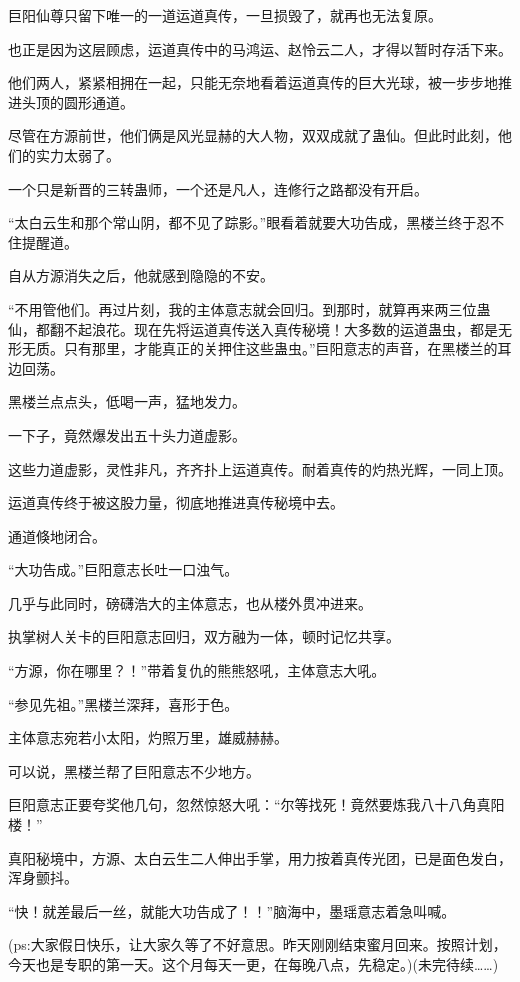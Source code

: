 \begin{this_body}
巨阳仙尊只留下唯一的一道运道真传，一旦损毁了，就再也无法复原。

也正是因为这层顾虑，运道真传中的马鸿运、赵怜云二人，才得以暂时存活下来。

他们两人，紧紧相拥在一起，只能无奈地看着运道真传的巨大光球，被一步步地推进头顶的圆形通道。

尽管在方源前世，他们俩是风光显赫的大人物，双双成就了蛊仙。但此时此刻，他们的实力太弱了。

一个只是新晋的三转蛊师，一个还是凡人，连修行之路都没有开启。

“太白云生和那个常山阴，都不见了踪影。”眼看着就要大功告成，黑楼兰终于忍不住提醒道。

自从方源消失之后，他就感到隐隐的不安。

“不用管他们。再过片刻，我的主体意志就会回归。到那时，就算再来两三位蛊仙，都翻不起浪花。现在先将运道真传送入真传秘境！大多数的运道蛊虫，都是无形无质。只有那里，才能真正的关押住这些蛊虫。”巨阳意志的声音，在黑楼兰的耳边回荡。

黑楼兰点点头，低喝一声，猛地发力。

一下子，竟然爆发出五十头力道虚影。

这些力道虚影，灵性非凡，齐齐扑上运道真传。耐着真传的灼热光辉，一同上顶。

运道真传终于被这股力量，彻底地推进真传秘境中去。

通道倏地闭合。

“大功告成。”巨阳意志长吐一口浊气。

几乎与此同时，磅礴浩大的主体意志，也从楼外贯冲进来。

执掌树人关卡的巨阳意志回归，双方融为一体，顿时记忆共享。

“方源，你在哪里？！”带着复仇的熊熊怒吼，主体意志大吼。

“参见先祖。”黑楼兰深拜，喜形于色。

主体意志宛若小太阳，灼照万里，雄威赫赫。

可以说，黑楼兰帮了巨阳意志不少地方。

巨阳意志正要夸奖他几句，忽然惊怒大吼：“尔等找死！竟然要炼我八十八角真阳楼！”

真阳秘境中，方源、太白云生二人伸出手掌，用力按着真传光团，已是面色发白，浑身颤抖。

“快！就差最后一丝，就能大功告成了！！”脑海中，墨瑶意志着急叫喊。

(ps:大家假日快乐，让大家久等了不好意思。昨天刚刚结束蜜月回来。按照计划，今天也是专职的第一天。这个月每天一更，在每晚八点，先稳定。)(未完待续……)

\end{this_body}

